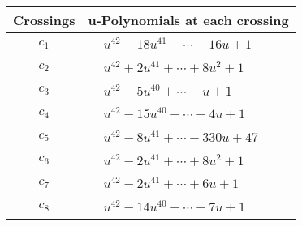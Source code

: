 \documentclass[1p]{elsarticle_modified}
\theoremstyle{definition}
\begin{document}
\begin{tabular}{m{50pt}|m{274pt}}
Crossings & \hspace{64pt}u-Polynomials at each crossing \\
\hline $$\begin{aligned}c_{1}\end{aligned}$$&$\begin{aligned}
&u^{42}-18 u^{41}+\cdots-16 u+1
\end{aligned}$\\
\hline $$\begin{aligned}c_{2}\end{aligned}$$&$\begin{aligned}
&u^{42}+2 u^{41}+\cdots+8 u^2+1
\end{aligned}$\\
\hline $$\begin{aligned}c_{3}\end{aligned}$$&$\begin{aligned}
&u^{42}-5 u^{40}+\cdots- u+1
\end{aligned}$\\
\hline $$\begin{aligned}c_{4}\end{aligned}$$&$\begin{aligned}
&u^{42}-15 u^{40}+\cdots+4 u+1
\end{aligned}$\\
\hline $$\begin{aligned}c_{5}\end{aligned}$$&$\begin{aligned}
&u^{42}-8 u^{41}+\cdots-330 u+47
\end{aligned}$\\
\hline $$\begin{aligned}c_{6}\end{aligned}$$&$\begin{aligned}
&u^{42}-2 u^{41}+\cdots+8 u^2+1
\end{aligned}$\\
\hline $$\begin{aligned}c_{7}\end{aligned}$$&$\begin{aligned}
&u^{42}-2 u^{41}+\cdots+6 u+1
\end{aligned}$\\
\hline $$\begin{aligned}c_{8}\end{aligned}$$&$\begin{aligned}
&u^{42}-14 u^{40}+\cdots+7 u+1
\end{aligned}$\\

\end{tabular}
\end{document}
